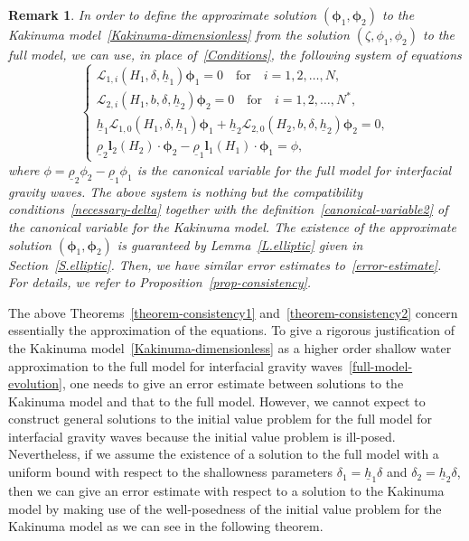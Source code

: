 \documentclass[11pt,leqno]{article}
\newtheorem{remark}[theorem]{\bf Remark}
\numberwithin{equation}{section}
\numberwithin{figure}{section}
\begin{document}
\begin{remark}\label{R.app-sol}
{\rm
In order to define the approximate solution $(\bm{\phi}_1,\bm{\phi}_2)$ to the Kakinuma model~\eqref{Kakinuma-dimensionless}
from the solution $(\zeta,\phi_1,\phi_2)$ to the full model, we can use, in place of~\eqref{Conditions}, 
the following system of equations 
%
\begin{equation}\label{Conditions-v2}
\begin{cases}
 \mathcal{L}_{1,i}(H_1,\delta,\underline{h}_1)\bm{\phi}_1=0 \quad\mbox{for}\quad i=1,2,\ldots,N, \\
 \mathcal{L}_{2,i}(H_1,b,\delta,\underline{h}_2)\bm{\phi}_2=0 \quad\mbox{for}\quad i=1,2,\ldots,N^*, \\
 \underline{h}_1\mathcal{L}_{1,0}(H_1,\delta,\underline{h}_1) {\bm \phi}_1
  + \underline{h}_2\mathcal{L}_{2,0}(H_2,b,\delta,\underline{h}_2) {\bm \phi}_2  = 0, \\
 \underline{\rho}_2\bm{l}_2(H_2)\cdot\bm{\phi}_2-\underline{\rho}_1\bm{l}_1(H_1)\cdot\bm{\phi}_1 = \phi,
\end{cases}
\end{equation}
%
where $\phi=\underline{\rho}_2\phi_2-\underline{\rho}_1\phi_1$ is the canonical variable for the full model 
for interfacial gravity waves. 
The above system is nothing but the compatibility conditions~\eqref{necessary-delta} together with 
the definition~\eqref{canonical-variable2} of the canonical variable for the Kakinuma model. 
The existence of the approximate solution $(\bm{\phi}_1,\bm{\phi}_2)$ is guaranteed by 
Lemma~\ref{L.elliptic} given in Section~\ref{S.elliptic}. 
Then, we have similar error estimates to~\eqref{error-estimate}. 
For details, we refer to Proposition~\ref{prop-consistency}. 
}
\end{remark}


The above Theorems~\ref{theorem-consistency1} and~\ref{theorem-consistency2} concern essentially the approximation of the equations. 
To give a rigorous justification of the Kakinuma model~\eqref{Kakinuma-dimensionless}
as a higher order shallow water approximation to the full model for interfacial gravity waves~\eqref{full-model-evolution}, one needs to give an error 
estimate between solutions to the Kakinuma model and that to the full model. 
However, we cannot expect to construct general solutions to the initial value problem for the full model for interfacial gravity waves 
because the initial value problem is ill-posed. 
Nevertheless, if we assume the existence of a solution to the full model with a uniform bound
with respect to the shallowness parameters $\delta_1=\underline{h}_1\delta$ and $\delta_2=\underline{h}_2\delta$, 
then we can give an error estimate with respect to a solution to the Kakinuma model by making use of the well-posedness of 
the initial value problem for the Kakinuma model as we can see in the following theorem. 
 
\end{document}
